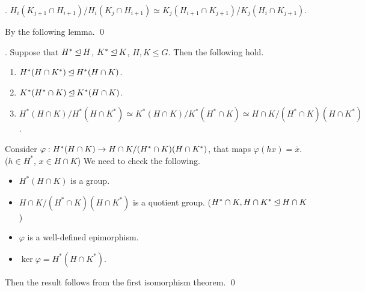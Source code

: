 \quad \claim. \(H_i (K_{j+1} \cap H_{i+1}) / H_i (K_j \cap H_{i+1}) \simeq K_j (H_{i+1} \cap K_{j+1}) / K_j (H_i \cap K_{j+1})\).

\quad \pf By the following lemma. \qed

\pagebreak

\lemma.  Suppose that \(H^* \unlhd H\), \(K^* \unlhd K\), \(H, K \leq G\). Then the following hold.
\begin{enumerate}
    \item \(H^* (H \cap K^*) \unlhd H^*(H \cap K)\).
    \item \(K^* (H^* \cap K) \unlhd K^*(H \cap K)\).
    \item \(H^* (H\cap K) / H^*(H\cap K^*) \simeq K^*(H\cap K) / K^*(H^* \cap K) \simeq H\cap K / (H^* \cap K)(H\cap K^*)\).
\end{enumerate}

\pf Consider \(\varphi: H^*(H\cap K) \rightarrow H\cap K / (H^*\cap K)(H\cap K^*)\), that maps \(\varphi(hx) = \bar{x}\). (\(h \in H^*\), \(x \in H\cap K\)) We need to check the following.
\begin{itemize}
    \item \(H^* (H\cap K)\) is a group.
    \item \(H\cap K / (H^*\cap K)(H\cap K^*)\) is a quotient group. (\(H^* \cap K, H \cap K^* \unlhd H\cap K\))
    \item \(\varphi\) is a well-defined epimorphism.
    \item \(\ker\varphi = H^* (H \cap K^*)\).
\end{itemize}
Then the result follows from the first isomorphism theorem. \qed

\pagebreak
